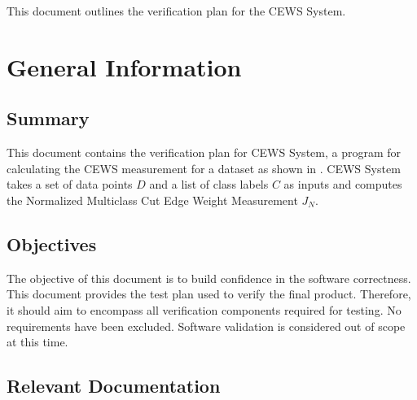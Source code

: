 \documentclass[12pt, titlepage]{article}
\begin{document}


\newpage


This document outlines the verification plan for the CEWS System.

\section{General Information}

\subsection{Summary}

This document contains the verification plan for CEWS System, a program for calculating the CEWS measurement for a dataset as shown in \cite{zighed_statistical_2005}.
CEWS System takes a set of data points $D$ and a list of class labels $C$ as inputs and computes the Normalized Multiclass Cut Edge Weight Measurement $J_N$.

\subsection{Objectives}

The objective of this document is to build confidence in the software correctness.
This document provides the test plan used to verify the final product.
Therefore, it should aim to encompass all verification components required for testing.
No requirements have been excluded.
Software validation is considered out of scope at this time.

\subsection{Relevant Documentation}
\end{document}
